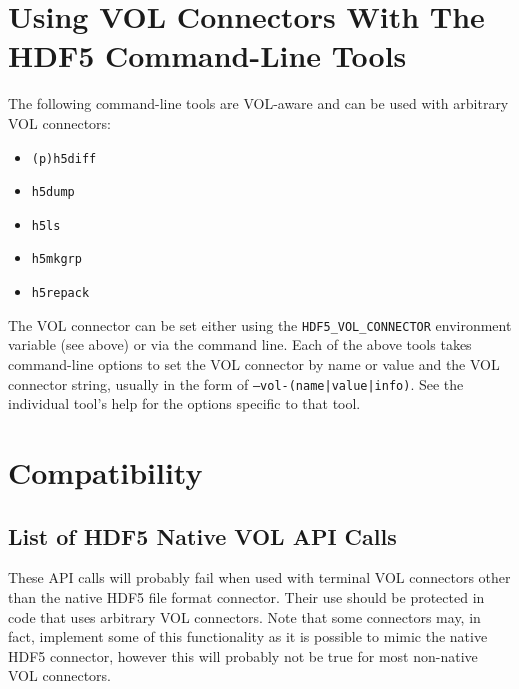 \section{Using VOL Connectors With The HDF5 Command-Line Tools}

The following command-line tools are VOL-aware and can be used with arbitrary VOL connectors:

\begin{itemize}
    \item {\tt (p)h5diff}
    \item {\tt h5dump}
    \item {\tt h5ls}
    \item {\tt h5mkgrp}
    \item {\tt h5repack}
\end{itemize}

The VOL connector can be set either using the {\tt HDF5\_VOL\_CONNECTOR} environment variable (see above) or via the command line. Each of the above tools takes command-line options to set the VOL connector by name or value and the VOL connector string, usually in the form of {\tt --vol-(name|value|info)}. See the individual tool's help for the options specific to that tool.

\section{Compatibility}

\subsection{List of HDF5 Native VOL API Calls}

These API calls will probably fail when used with terminal VOL connectors other than the native HDF5 file format connector. Their use should be protected in code that uses arbitrary VOL connectors. Note that some connectors may, in fact, implement some of this functionality as it is possible to mimic the native HDF5 connector, however this will probably not be true for most non-native VOL connectors.

